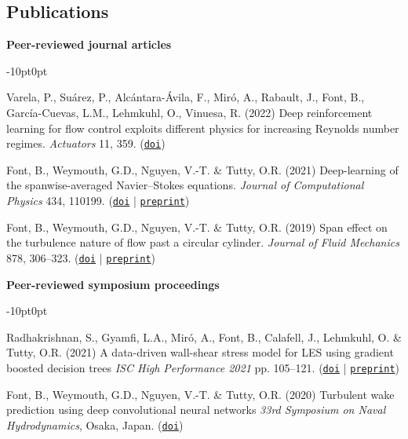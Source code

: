 \documentclass[line]{res}
\newenvironment{p}
  {\begin{adjustwidth}{-10pt}{0pt}}
  {\end{adjustwidth}}
\begin{document}
\begin{resume}
\section{Publications}
\vspace{0.25cm}
\hspace{-1cm}\textbf{Peer-reviewed journal articles}\vspace{0.25cm}
\begin{p}
\begin{etaremune}[leftmargin=-2pt,parsep=5pt]
\item Varela, P., Suárez, P., Alcántara-Ávila, F., Miró, A., Rabault, J., Font, B., García-Cuevas, L.M., Lehmkuhl, O., Vinuesa, R. (2022) Deep reinforcement learning for flow control exploits different physics for increasing Reynolds number regimes. \textit{Actuators} 11, 359. (\href{https://doi.org/10.3390/act11120359}{\texttt{doi}})
\item Font, B., Weymouth, G.D., Nguyen, V.-T. \& Tutty, O.R. (2021) Deep-learning of the spanwise-averaged Navier--Stokes equations. \textit{Journal of Computational Physics} 434, 110199. (\href{https://doi.org/10.1016/j.jcp.2021.110199}{\texttt{doi}} | \href{https://arxiv.org/abs/2008.07528}{\texttt{preprint}})
\item Font, B., Weymouth, G.D., Nguyen, V.-T. \& Tutty, O.R. (2019) Span effect on the turbulence nature of flow past a circular cylinder. \textit{Journal of Fluid Mechanics} 878, 306--323. (\href{https://doi.org/10.1017/jfm.2019.637}{\texttt{doi}} | \href{https://arxiv.org/abs/2008.08933}{\texttt{preprint}})
\end{etaremune}
\end{p}

\newpage

\hspace{-1cm}\textbf{Peer-reviewed symposium proceedings}\vspace{0.25cm}
\begin{p}
\begin{etaremune}[leftmargin=-2pt,parsep=5pt]
\item Radhakrishnan, S., Gyamfi, L.A., Mir\'{o}, A., Font, B., Calafell, J., Lehmkuhl, O. \& Tutty, O.R. (2021) A data-driven wall-shear stress model for LES using gradient boosted decision trees \textit{ISC High Performance 2021} pp. 105--121. (\href{https://doi.org/10.1007/978-3-030-90539-2_7}{\texttt{doi}} | \href{https://upcommons.upc.edu/bitstream/handle/2117/358666/Manuscript_isc2021.pdf?sequence=3}{\texttt{preprint}})
\item Font, B., Weymouth, G.D., Nguyen, V.-T. \& Tutty, O.R. (2020) Turbulent wake prediction using deep convolutional neural networks \textit{33rd Symposium on Naval Hydrodynamics}, Osaka, Japan. (\href{https://eprints.soton.ac.uk/444591/}{\texttt{doi}})
\end{etaremune}
\end{p}


\end{resume}
\end{document}
